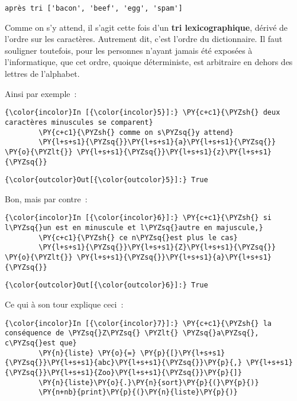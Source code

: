     \begin{Verbatim}[commandchars=\\\{\}]
après tri ['bacon', 'beef', 'egg', 'spam']

    \end{Verbatim}

    Comme on s'y attend, il s'agit cette fois d'un \textbf{tri
lexicographique}, dérivé de l'ordre sur les caractères. Autrement dit,
c'est l'ordre du dictionnaire. Il faut souligner toutefois, pour les
personnes n'ayant jamais été exposées à l'informatique, que cet ordre,
quoique déterministe, est arbitraire en dehors des lettres de
l'alphabet.

    Ainsi par exemple~:

    \begin{Verbatim}[commandchars=\\\{\}]
{\color{incolor}In [{\color{incolor}5}]:} \PY{c+c1}{\PYZsh{} deux caractères minuscules se comparent}
        \PY{c+c1}{\PYZsh{} comme on s\PYZsq{}y attend}
        \PY{l+s+s1}{\PYZsq{}}\PY{l+s+s1}{a}\PY{l+s+s1}{\PYZsq{}} \PY{o}{\PYZlt{}} \PY{l+s+s1}{\PYZsq{}}\PY{l+s+s1}{z}\PY{l+s+s1}{\PYZsq{}}
\end{Verbatim}


\begin{Verbatim}[commandchars=\\\{\}]
{\color{outcolor}Out[{\color{outcolor}5}]:} True
\end{Verbatim}
            
    Bon, mais par contre~:

    \begin{Verbatim}[commandchars=\\\{\}]
{\color{incolor}In [{\color{incolor}6}]:} \PY{c+c1}{\PYZsh{} si l\PYZsq{}un est en minuscule et l\PYZsq{}autre en majuscule,}
        \PY{c+c1}{\PYZsh{} ce n\PYZsq{}est plus le cas}
        \PY{l+s+s1}{\PYZsq{}}\PY{l+s+s1}{Z}\PY{l+s+s1}{\PYZsq{}} \PY{o}{\PYZlt{}} \PY{l+s+s1}{\PYZsq{}}\PY{l+s+s1}{a}\PY{l+s+s1}{\PYZsq{}}
\end{Verbatim}


\begin{Verbatim}[commandchars=\\\{\}]
{\color{outcolor}Out[{\color{outcolor}6}]:} True
\end{Verbatim}
            
    Ce qui à son tour explique ceci~:

    \begin{Verbatim}[commandchars=\\\{\}]
{\color{incolor}In [{\color{incolor}7}]:} \PY{c+c1}{\PYZsh{} la conséquence de \PYZsq{}Z\PYZsq{} \PYZlt{} \PYZsq{}a\PYZsq{}, c\PYZsq{}est que}
        \PY{n}{liste} \PY{o}{=} \PY{p}{[}\PY{l+s+s1}{\PYZsq{}}\PY{l+s+s1}{abc}\PY{l+s+s1}{\PYZsq{}}\PY{p}{,} \PY{l+s+s1}{\PYZsq{}}\PY{l+s+s1}{Zoo}\PY{l+s+s1}{\PYZsq{}}\PY{p}{]}
        \PY{n}{liste}\PY{o}{.}\PY{n}{sort}\PY{p}{(}\PY{p}{)}
        \PY{n+nb}{print}\PY{p}{(}\PY{n}{liste}\PY{p}{)}
\end{Verbatim}



